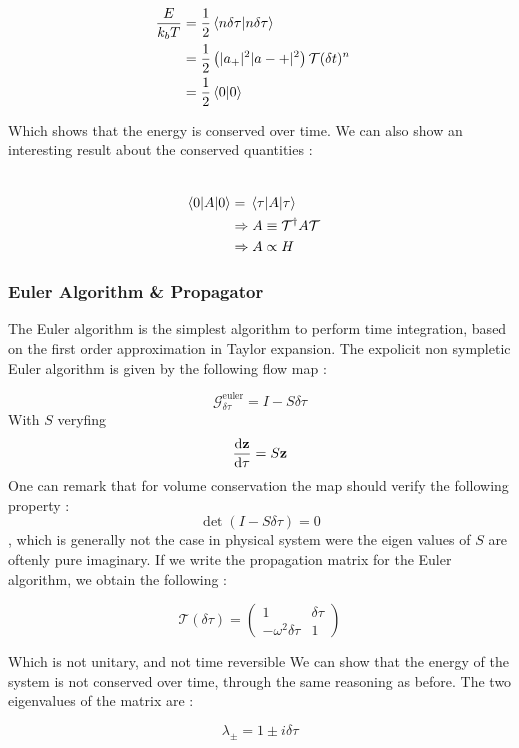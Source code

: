 \documentclass[ansiapaper]{report}
\begin{document}
\begin{multicols}{3}
	\begin{align*}
		\\ \frac{E}{k_bT} &= \frac{1}{2}\braket{n \delta \tau}{n \delta \tau}
		\\ &=\frac{1}{2}\left(\lvert a_+ \rvert^2 \lvert a-+ \rvert^2 \right)\mathcal{T}(\delta t)^n
		\\ &= \frac{1}{2} \braket{0}{0}
	\end{align*}

	Which shows that the energy is conserved over time. We can also show an interesting result about the conserved quantities :

	\begin{align*}
		\\ \expval{A}{0} &=\expval{A}{\tau}
		\\  & \Rightarrow A \equiv \mathcal{T}^\dagger A \mathcal{T}
		\\ & \Rightarrow A \propto H
	\end{align*}


	\subsubsection{Euler Algorithm \& Propagator}

	The Euler algorithm is the simplest algorithm to perform time integration, based on the first order approximation in Taylor expansion. The expolicit non sympletic Euler algorithm is given by the following flow map :

	$$\mathcal{G}_{\delta \tau}^{\text{euler}} = I - S \delta \tau $$ With $S$ veryfing $$\dv{\textbf{z} }{\tau} = S \textbf{z} $$ One can remark that for volume conservation the map should verify the following property : $$\det(I - S \delta \tau) =  0$$, which is generally not the case in physical system were the eigen values of $S$ are oftenly pure imaginary. If we write the propagation matrix for the Euler algorithm, we obtain the following :

	$$ \mathcal{T}(\delta \tau) =
		\begin{pmatrix}
			1                     & \delta \tau \\
			-\omega^2 \delta \tau & 1
		\end{pmatrix}
	$$

	Which is not unitary, and not time reversible We can show that the energy of the system is not conserved over time, through the same reasoning as before. The two eigenvalues of the matrix are :

	$$ \lambda_\pm = 1 \pm i \delta \tau$$


\end{multicols}
\end{document}
